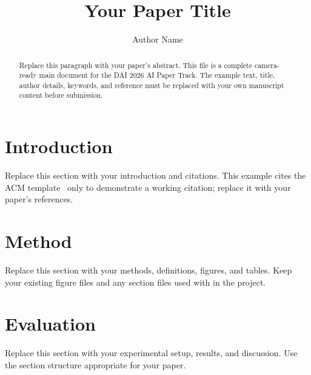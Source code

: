 \documentclass[sigconf,nonacm]{acmart}
\begin{document}
\title{Your Paper Title}

\author{Author Name}

\begin{abstract}
Replace this paragraph with your paper's abstract. This file is a complete
camera-ready main document for the DAI 2026 AI Paper Track. The example
text, title, author details, keywords, and reference must be replaced with
your own manuscript content before submission.
\end{abstract}


\maketitle

\section{Introduction}
Replace this section with your introduction and citations. This example
cites the ACM template~\cite{acm-template} only to demonstrate a working
citation; replace it with your paper's references.

\section{Method}
Replace this section with your methods, definitions, figures, and tables.
Keep your existing figure files and any section files used with
\texttt{\string} in the project.

\section{Evaluation}
Replace this section with your experimental setup, results, and discussion.
Use the section structure appropriate for your paper.
\end{document}
